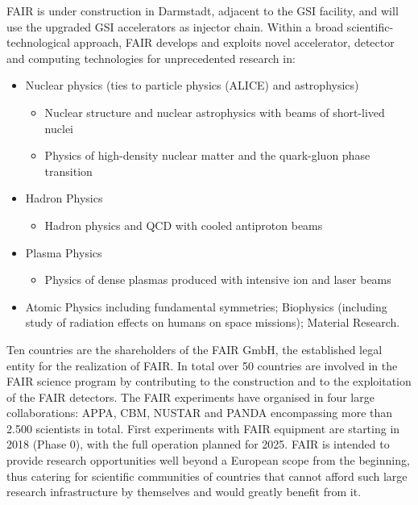 \documentclass[fleqn,11pt]{wlscirep}
\begin{document}
{FAIR is under construction in Darmstadt, adjacent to the GSI facility, and will use the upgraded GSI accelerators as injector chain. Within a broad scientific-technological approach, FAIR develops and exploits novel accelerator, detector and computing technologies for unprecedented research in:
 \begin{itemize}
 \item Nuclear physics (ties to particle physics (ALICE) and astrophysics)
 \begin{itemize}
   \item Nuclear structure and nuclear astrophysics with beams of short-lived nuclei
   \item Physics of high-density nuclear matter and the quark-gluon phase transition
 \end{itemize}
 \item Hadron Physics
 \begin{itemize}
 \item Hadron physics and QCD with cooled antiproton beams
 \end{itemize}
 \item Plasma Physics
 \begin{itemize}
 \item Physics of dense plasmas produced with intensive ion and laser beams
 \end{itemize}
 \item Atomic Physics including fundamental symmetries; Biophysics (including study of radiation effects on humans on space missions); Material Research.
 \end{itemize}
 
Ten countries are the shareholders of the FAIR GmbH, the established legal entity for the realization of FAIR. In total over 50 countries are involved in the FAIR science program by contributing to the construction and to the exploitation of the FAIR detectors. The FAIR experiments have organised in four large collaborations: APPA, CBM, NUSTAR and PANDA encompassing more than 2.500 scientists in total. First experiments with FAIR equipment are starting in 2018 (Phase 0), with the full operation planned for 2025. FAIR is intended to provide research opportunities well beyond a European scope from the beginning, thus catering for scientific communities of countries that cannot afford such large research infrastructure by themselves and would greatly benefit from it.

}
\end{document}
